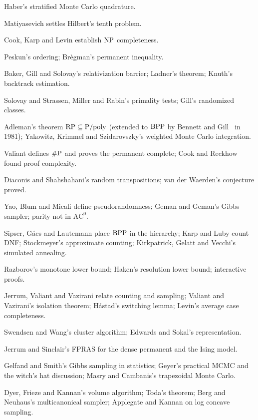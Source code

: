 \begin{description}[style=nextline]
\item[1966] Haber's stratified Monte Carlo quadrature.
\item[1970] Matiyasevich settles Hilbert's tenth problem.
\item[1971 to 1973] Cook, Karp and Levin establish $\mathrm{NP}$ completeness.
\item[1973] Peskun's ordering; Br\`egman's permanent inequality.
\item[1975] Baker, Gill and Solovay's relativization barrier; Ladner's theorem; Knuth's backtrack estimation.
\item[1976 to 1980] Solovay and Strassen, Miller and Rabin's primality tests; Gill's randomized classes.
\item[1978] Adleman's theorem $\mathrm{RP} \subseteq \mathrm{P}/\mathrm{poly}$ (extended to $\mathrm{BPP}$ by Bennett and Gill~\cite{BennettGill} in 1981); Yakowitz, Krimmel and Szidarovszky's weighted Monte Carlo integration.
\item[1979] Valiant defines $\#\mathrm{P}$ and proves the permanent complete; Cook and Reckhow found proof complexity.
\item[1981] Diaconis and Shahshahani's random transpositions; van der Waerden's conjecture proved.
\item[1982 to 1984] Yao, Blum and Micali define pseudorandomness; Geman and Geman's Gibbs sampler; parity not in $\mathrm{AC}^0$.
\item[1983] Sipser, G\'acs and Lautemann place $\mathrm{BPP}$ in the hierarchy; Karp and Luby count DNF; Stockmeyer's approximate counting; Kirkpatrick, Gelatt and Vecchi's simulated annealing.
\item[1985] Razborov's monotone lower bound; Haken's resolution lower bound; interactive proofs.
\item[1986] Jerrum, Valiant and Vazirani relate counting and sampling; Valiant and Vazirani's isolation theorem; H{\aa}stad's switching lemma; Levin's average case completeness.
\item[1987 to 1988] Swendsen and Wang's cluster algorithm; Edwards and Sokal's representation.
\item[1989] Jerrum and Sinclair's FPRAS for the dense permanent and the Ising model.
\item[1990 to 1992] Gelfand and Smith's Gibbs sampling in statistics; Geyer's practical MCMC and the witch's hat discussion; Masry and Cambanis's trapezoidal Monte Carlo.
\item[1991] Dyer, Frieze and Kannan's volume algorithm; Toda's theorem; Berg and Neuhaus's multicanonical sampler; Applegate and Kannan on log concave sampling.

\end{description}
